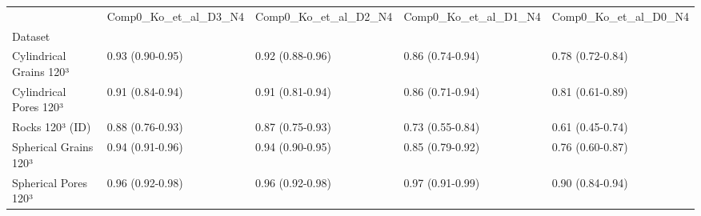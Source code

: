 \begin{tabular}{lllll}
\toprule
 & Comp0_Ko_et_al_D3_N4 & Comp0_Ko_et_al_D2_N4 & Comp0_Ko_et_al_D1_N4 & Comp0_Ko_et_al_D0_N4 \\
Dataset &  &  &  &  \\
\midrule
Cylindrical Grains 120³ & 0.93 (0.90-0.95) & 0.92 (0.88-0.96) & 0.86 (0.74-0.94) & 0.78 (0.72-0.84) \\
Cylindrical Pores 120³ & 0.91 (0.84-0.94) & 0.91 (0.81-0.94) & 0.86 (0.71-0.94) & 0.81 (0.61-0.89) \\
Rocks 120³ (ID) & 0.88 (0.76-0.93) & 0.87 (0.75-0.93) & 0.73 (0.55-0.84) & 0.61 (0.45-0.74) \\
Spherical Grains 120³ & 0.94 (0.91-0.96) & 0.94 (0.90-0.95) & 0.85 (0.79-0.92) & 0.76 (0.60-0.87) \\
Spherical Pores 120³ & 0.96 (0.92-0.98) & 0.96 (0.92-0.98) & 0.97 (0.91-0.99) & 0.90 (0.84-0.94) \\
\bottomrule
\end{tabular}
